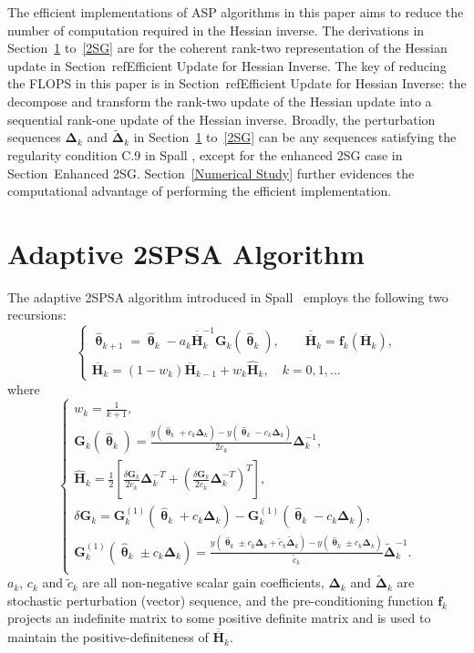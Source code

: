 \documentclass[conference]{IEEEtran}
\newcommand{\bG}{\bm{G}}
\newcommand{\bDelta}{\bm{\Delta}}
\newcommand{\oH}{\bm{\overline{H}}}
\newcommand{\ooH}{\bm{\overline{\overline{H}}}}
\newcommand{\hH}{\bm{\hat{H}}}
\newcommand{\htheta}{\bm{\hat{\uptheta}}}
\newcommand{\tDelta}{\bm{\tilde{\Delta}}}
\begin{document}
The efficient implementations of ASP algorithms in this paper aims to reduce the number of computation required in the Hessian inverse. The derivations in Section~\ref{2SPSA} to~\ref{2SG} are for the coherent rank-two representation of the Hessian update in Section~ref{Efficient Update for Hessian Inverse}. The key of reducing the FLOPS in this paper is in Section~ref{Efficient Update for Hessian Inverse}: the decompose and transform the rank-two update of the Hessian update into a sequential rank-one update of the Hessian inverse. Broadly, the perturbation sequences $\bDelta_k$ and
$\tDelta_k$ in Section~\ref{2SPSA} to~\ref{2SG} can be any sequences
satisfying the regularity condition C.9 in Spall
\cite{Spall2009}, except for the enhanced 2SG case in Section~{Enhanced 2SG}. Section~\ref{Numerical Study} further evidences the computational advantage of performing the efficient implementation. 

\section{Adaptive 2SPSA Algorithm}
\label{2SPSA}
The adaptive 2SPSA algorithm introduced in Spall~\cite{Spall2000} employs the following
two recursions:
\begin{equation} \label{eq:Adaptation}
  \begin{cases}
    \htheta_{k+1}=\htheta_k-a_k\ooH_k^{-1} \bG_k(\htheta_k),
  \qquad \bm{\ooH}_k=\bm{f}_k(\oH_k),\\ \oH_k= (1 - w_k) \oH_{k-1}+ w_k \hH_k,
 \quad k=0,1,\dots
  \end{cases}
\end{equation}
where
\begin{equation} \label{eq:notations}
  \begin{cases} w_k=\frac{1}{k+1},\\
    \bG_k(\htheta_k)=\frac{y(\htheta_k+c_k\bDelta_k)-y(\htheta_k-c_k\bDelta_k)}{2c_k}\bDelta_k^{-1},\\
    \hH_k=\frac{1}{2}\left[
      \frac{\delta\bG_k}{2c_k}\bDelta_k^{-T}+\left(\frac{\delta\bG_k}{2c_k}\bDelta_k^{-T}\right)^T \right],\\
    \delta\bG_k=\bG_k^{(1)}(\htheta_k+ c_k\bDelta_k)-\bG_k^{(1)}(\htheta_k- c_k\bDelta_k),\\
    \bG_k^{(1)}(\htheta_k\pm c_k\bDelta_k) =\frac{y(\htheta_k\pm c_k\bDelta_k+\tilde{c}_k\tDelta_k)-y(\htheta_k\pm c_k\bDelta_k)}{\tilde{c}_k}\tDelta_k^{-1}.\\
  \end{cases}
\end{equation} $ a_k $, $ c_k $ and $ \tilde{c}_k $ are all
non-negative scalar gain coefficients, $ \bDelta_k $ and $ \tDelta_k $
are stochastic perturbation (vector) sequence, and the
pre-conditioning function $ \bm{f}_k $ projects an indefinite matrix
to some positive definite matrix and is used to maintain the
positive-definiteness of $\ooH_k$.
\end{document}
